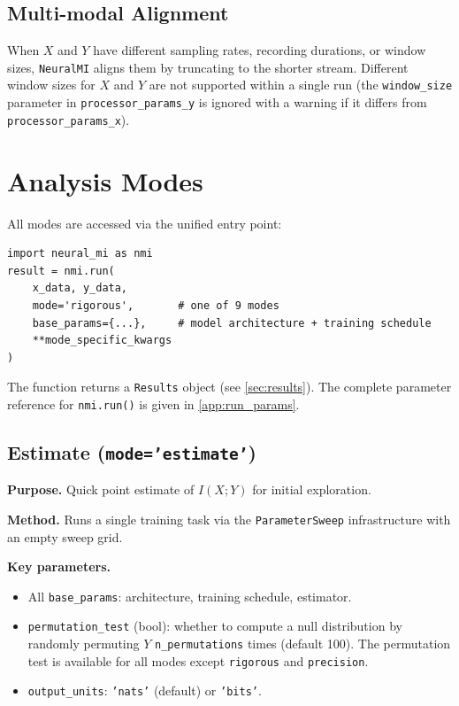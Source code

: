 \documentclass[12pt]{article}
\newcommand{\nmi}{\texttt{NeuralMI}}
\newcommand{\api}[1]{\texttt{#1}}
\newcommand{\MI}[1]{I(#1)}
\begin{document}
\subsection{Multi-modal Alignment}
\label{sec:data:multimodal}

When $X$ and $Y$ have different sampling rates, recording durations, or
window sizes, \nmi{} aligns them by truncating to the shorter stream.
Different window sizes for $X$ and $Y$ are not supported within a single
run (the \api{window\_size} parameter in \api{processor\_params\_y} is
ignored with a warning if it differs from \api{processor\_params\_x}).

\section{Analysis Modes}
\label{sec:modes}

All modes are accessed via the unified entry point:
\begin{lstlisting}
import neural_mi as nmi
result = nmi.run(
    x_data, y_data,
    mode='rigorous',       # one of 9 modes
    base_params={...},     # model architecture + training schedule
    **mode_specific_kwargs
)
\end{lstlisting}

The function returns a \api{Results} object (see \cref{sec:results}).  The
complete parameter reference for \api{nmi.run()} is given in
\cref{app:run_params}.

\subsection{Estimate (\texttt{mode='estimate'})}
\label{sec:modes:estimate}

\textbf{Purpose.}  Quick point estimate of $\MI{X;Y}$ for initial
exploration.

\textbf{Method.}  Runs a single training task via the \api{ParameterSweep}
infrastructure with an empty sweep grid.

\textbf{Key parameters.}
\begin{itemize}[leftmargin=*]
  \item All \api{base\_params}: architecture, training schedule, estimator.
  \item \api{permutation\_test} (bool): whether to compute a null
        distribution by randomly permuting $Y$ \api{n\_permutations} times
        (default 100).  The permutation test is available for all modes
        except \api{rigorous} and \api{precision}.
  \item \api{output\_units}: \api{'nats'} (default) or \api{'bits'}.
\end{itemize}
\end{document}
